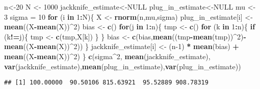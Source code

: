 \documentclass[]{article}
\newenvironment{Shaded}{\begin{snugshade}}{\end{snugshade}}
\newcommand{\KeywordTok}[1]{\textcolor[rgb]{0.13,0.29,0.53}{\textbf{#1}}}
\newcommand{\DecValTok}[1]{\textcolor[rgb]{0.00,0.00,0.81}{#1}}
\newcommand{\StringTok}[1]{\textcolor[rgb]{0.31,0.60,0.02}{#1}}
\newcommand{\OtherTok}[1]{\textcolor[rgb]{0.56,0.35,0.01}{#1}}
\newcommand{\ControlFlowTok}[1]{\textcolor[rgb]{0.13,0.29,0.53}{\textbf{#1}}}
\newcommand{\OperatorTok}[1]{\textcolor[rgb]{0.81,0.36,0.00}{\textbf{#1}}}
\newcommand{\NormalTok}[1]{#1}
\begin{document}
\begin{Shaded}
\begin{Highlighting}[]
\NormalTok{n<-}\DecValTok{20}
\NormalTok{N <-}\StringTok{ }\DecValTok{1000}
\NormalTok{jackknife_estimate<-}\OtherTok{NULL}
\NormalTok{plug_in_estimate<-}\OtherTok{NULL}
\NormalTok{mu <-}\StringTok{ }\DecValTok{3}
\NormalTok{sigma =}\StringTok{ }\DecValTok{10}
\ControlFlowTok{for}\NormalTok{ (i }\ControlFlowTok{in} \DecValTok{1}\OperatorTok{:}\NormalTok{N)\{}
\NormalTok{  X <-}\StringTok{ }\KeywordTok{rnorm}\NormalTok{(n,mu,sigma)}
\NormalTok{  plug_in_estimate[i] <-}\StringTok{ }\KeywordTok{mean}\NormalTok{((X}\OperatorTok{-}\KeywordTok{mean}\NormalTok{(X))}\OperatorTok{^}\DecValTok{2}\NormalTok{)}
\NormalTok{  bias <-}\StringTok{ }\KeywordTok{c}\NormalTok{()}
  \ControlFlowTok{for}\NormalTok{(j }\ControlFlowTok{in} \DecValTok{1}\OperatorTok{:}\NormalTok{n)\{}
\NormalTok{    tmp <-}\StringTok{ }\KeywordTok{c}\NormalTok{()}
    \ControlFlowTok{for}\NormalTok{ (k }\ControlFlowTok{in} \DecValTok{1}\OperatorTok{:}\NormalTok{n)\{}
      \ControlFlowTok{if}\NormalTok{ (k}\OperatorTok{!=}\NormalTok{j)\{}
\NormalTok{        tmp <-}\StringTok{ }\KeywordTok{c}\NormalTok{(tmp,X[k])}
\NormalTok{      \}}
\NormalTok{    \}}
\NormalTok{    bias <-}\StringTok{ }\KeywordTok{c}\NormalTok{(bias,}\KeywordTok{mean}\NormalTok{((tmp}\OperatorTok{-}\KeywordTok{mean}\NormalTok{(tmp))}\OperatorTok{^}\DecValTok{2}\NormalTok{)}\OperatorTok{-}\KeywordTok{mean}\NormalTok{((X}\OperatorTok{-}\KeywordTok{mean}\NormalTok{(X))}\OperatorTok{^}\DecValTok{2}\NormalTok{))}
\NormalTok{  \}}
\NormalTok{  jackknife_estimate[i] <-}\StringTok{ }\NormalTok{(n}\DecValTok{-1}\NormalTok{) }\OperatorTok{*}\StringTok{ }\KeywordTok{mean}\NormalTok{(bias) }\OperatorTok{+}\StringTok{ }\KeywordTok{mean}\NormalTok{((X}\OperatorTok{-}\KeywordTok{mean}\NormalTok{(X))}\OperatorTok{^}\DecValTok{2}\NormalTok{)}
\NormalTok{\}}
\KeywordTok{c}\NormalTok{(sigma}\OperatorTok{^}\DecValTok{2}\NormalTok{, }\KeywordTok{mean}\NormalTok{(jackknife_estimate), }\KeywordTok{var}\NormalTok{(jackknife_estimate),}\KeywordTok{mean}\NormalTok{(plug_in_estimate),}\KeywordTok{var}\NormalTok{(plug_in_estimate))}
\end{Highlighting}
\end{Shaded}

\begin{verbatim}
## [1] 100.00000  90.50106 815.63921  95.52889 908.78319
\end{verbatim}
\end{document}
